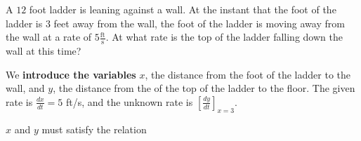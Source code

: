 \documentclass{ximera}
\author{Steven Gubkin\and Nela Lakos}
\begin{document}
\begin{exercise}


A $12$ foot ladder is leaning against a wall.  At the instant that the foot of the ladder is $3$ feet away from the wall, the foot of the ladder is moving away from the wall at a rate of $5 \frac{\textrm{ft}}{\textrm{s}}$.  At what rate is the top of the ladder falling down the wall at this time?


\begin{hint}
We \textbf{introduce the variables}  $x$, the distance from  the foot of the ladder to the wall, and $y$, the distance from the of the top of the ladder to the floor. The given rate is $\frac{dx}{dt}=5$ ft/s, and the unknown rate is $\left[\frac{dy}{dt}\right]_{x=3}$. 
\end{hint}



\begin{hint}


  \begin{image}
    \end{image}
\end{hint}


\begin{hint}


	$x$ and $y$ must satisfy the relation


\end{hint}
\end{exercise}
\end{document}
